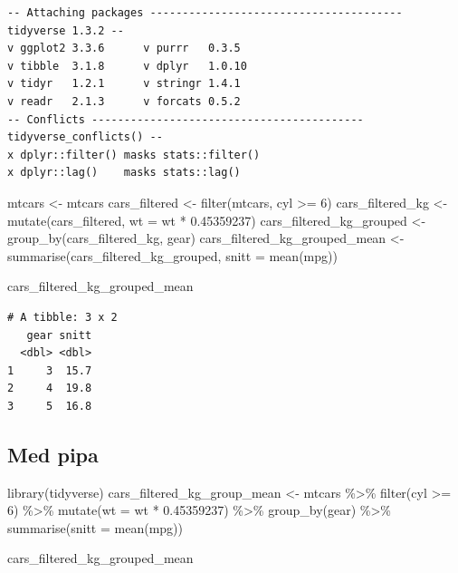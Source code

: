 \documentclass[
  letterpaper,
  DIV=11,
  numbers=noendperiod]{scrreprt}
\newenvironment{Shaded}{\begin{snugshade}}{\end{snugshade}}
\newcommand{\AttributeTok}[1]{\textcolor[rgb]{0.40,0.45,0.13}{#1}}
\newcommand{\DecValTok}[1]{\textcolor[rgb]{0.68,0.00,0.00}{#1}}
\newcommand{\FloatTok}[1]{\textcolor[rgb]{0.68,0.00,0.00}{#1}}
\newcommand{\FunctionTok}[1]{\textcolor[rgb]{0.28,0.35,0.67}{#1}}
\newcommand{\NormalTok}[1]{\textcolor[rgb]{0.00,0.23,0.31}{#1}}
\newcommand{\OtherTok}[1]{\textcolor[rgb]{0.00,0.23,0.31}{#1}}
\newcommand{\SpecialCharTok}[1]{\textcolor[rgb]{0.37,0.37,0.37}{#1}}
\begin{document}
\begin{verbatim}
-- Attaching packages --------------------------------------- tidyverse 1.3.2 --
v ggplot2 3.3.6      v purrr   0.3.5 
v tibble  3.1.8      v dplyr   1.0.10
v tidyr   1.2.1      v stringr 1.4.1 
v readr   2.1.3      v forcats 0.5.2 
-- Conflicts ------------------------------------------ tidyverse_conflicts() --
x dplyr::filter() masks stats::filter()
x dplyr::lag()    masks stats::lag()
\end{verbatim}

\begin{Shaded}
\begin{Highlighting}[]
\NormalTok{mtcars }\OtherTok{\textless{}{-}}\NormalTok{ mtcars}
\NormalTok{cars\_filtered }\OtherTok{\textless{}{-}} \FunctionTok{filter}\NormalTok{(mtcars, cyl }\SpecialCharTok{\textgreater{}=} \DecValTok{6}\NormalTok{)}
\NormalTok{cars\_filtered\_kg }\OtherTok{\textless{}{-}} \FunctionTok{mutate}\NormalTok{(cars\_filtered, }\AttributeTok{wt =}\NormalTok{ wt }\SpecialCharTok{*} \FloatTok{0.45359237}\NormalTok{)}
\NormalTok{cars\_filtered\_kg\_grouped }\OtherTok{\textless{}{-}} \FunctionTok{group\_by}\NormalTok{(cars\_filtered\_kg, gear)}
\NormalTok{cars\_filtered\_kg\_grouped\_mean }\OtherTok{\textless{}{-}} \FunctionTok{summarise}\NormalTok{(cars\_filtered\_kg\_grouped, }\AttributeTok{snitt =} \FunctionTok{mean}\NormalTok{(mpg))}

\NormalTok{cars\_filtered\_kg\_grouped\_mean}
\end{Highlighting}
\end{Shaded}

\begin{verbatim}
# A tibble: 3 x 2
   gear snitt
  <dbl> <dbl>
1     3  15.7
2     4  19.8
3     5  16.8
\end{verbatim}

\hypertarget{med-pipe}{%
\subsection{Med pipa}\label{med-pipe}}

\begin{Shaded}
\begin{Highlighting}[]
\FunctionTok{library}\NormalTok{(tidyverse)}
\NormalTok{cars\_filtered\_kg\_group\_mean }\OtherTok{\textless{}{-}}\NormalTok{ mtcars }\SpecialCharTok{\%\textgreater{}\%} 
  \FunctionTok{filter}\NormalTok{(cyl }\SpecialCharTok{\textgreater{}=} \DecValTok{6}\NormalTok{) }\SpecialCharTok{\%\textgreater{}\%} 
  \FunctionTok{mutate}\NormalTok{(}\AttributeTok{wt =}\NormalTok{ wt }\SpecialCharTok{*} \FloatTok{0.45359237}\NormalTok{) }\SpecialCharTok{\%\textgreater{}\%} 
  \FunctionTok{group\_by}\NormalTok{(gear) }\SpecialCharTok{\%\textgreater{}\%} 
  \FunctionTok{summarise}\NormalTok{(}\AttributeTok{snitt =} \FunctionTok{mean}\NormalTok{(mpg))}

\NormalTok{cars\_filtered\_kg\_grouped\_mean}
\end{Highlighting}
\end{Shaded}
\end{document}
